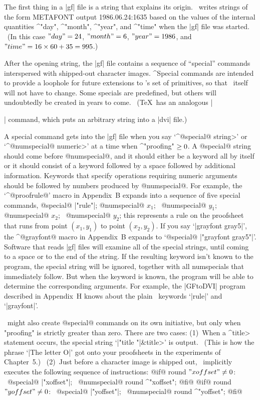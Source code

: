 \smallskip
The first thing in a |gf| file is a string that explains its origin.
\MF\ writes strings of the form
\begintt
METAFONT output 1986.06.24:1635
\endtt
based on the values of the internal quantities ^"day", ^"month",
^"year", and ^"time" when the |gf| file was started. \ (In this case
$"day"=24$, $"month"=6$, $"year"=1986$, %
and $"time"=16\times60+35=995$.)

After the opening string, the |gf| file contains a sequence of
``special'' commands interspersed with shipped-out character images.
^{Special commands} are intended to provide a loophole for future
extensions to \MF's set of primitives, so that \MF\ itself will not
have to change. Some specials are predefined, but others will
undoubtedly be created in years to come. \ (\TeX\ has an analogous
|\special| command, which puts an arbitrary string into a |dvi| file.)

A special command gets into the |gf| file when you say `^@special@
\<string>' or `^@numspecial@ \<numeric>' at a time when
^"proofing"$\null\ge0$.  A @special@ string should come before
@numspecial@, and it
should either be a keyword all by itself or it should consist of a keyword
followed by a space followed by additional information. Keywords that
specify operations requiring numeric arguments should be followed by
numbers produced by @numspecial@. For example, the `^@proofrule@' macro
in Appendix~B expands into a sequence of five special commands,
\begindisplay
@special@ |"rule"|;\cr
@numspecial@ $x_1$; \ @numspecial@ $y_1$;\cr
@numspecial@ $x_2$; \ @numspecial@ $y_2$;\cr
\enddisplay
this represents a rule on the proofsheet that runs from point $(x_1,y_1)$
to point $(x_2,y_2)$. If you say `|grayfont gray5|', the ^@grayfont@
macro in Appendix~B expands to `@special@ |"grayfont gray5"|'.
Software that reads |gf| files will examine all of the special strings,
until coming to a space or to the end of the string. If the resulting
keyword isn't known to the program, the special string will be ignored,
together with all numspecials that immediately follow. But when the
keyword is known, the program will be able to determine the corresponding
arguments.  For example, the |GFtoDVI| program described in Appendix~H
knows about the plain \MF\ keywords `|rule|' and `|grayfont|'.

\MF\ might also create @special@ commands on its own initiative, but only
when "proofing" is strictly greater than zero. There are
two cases: (1)~When a ^\<title> statement occurs,
the special string `|"title "|\thinspace\&\thinspace\<title>'
is output. \ (This is how the phrase `|The letter O|' got onto your
proofsheets in the experiments of Chapter~5.) \ (2)~Just before a
character image is shipped out, \MF\ implicitly executes the following
sequence of instructions:
\begindisplay
@if@ round $"xoffset"\ne0$: \ @special@ |"xoffset"|; \
 @numspecial@ round ^"xoffset"; @fi@\cr
@if@ round $"yoffset"\ne0$: \ @special@ |"yoffset"|; \
 @numspecial@ round ^"yoffset"; @fi@\cr
\enddisplay

